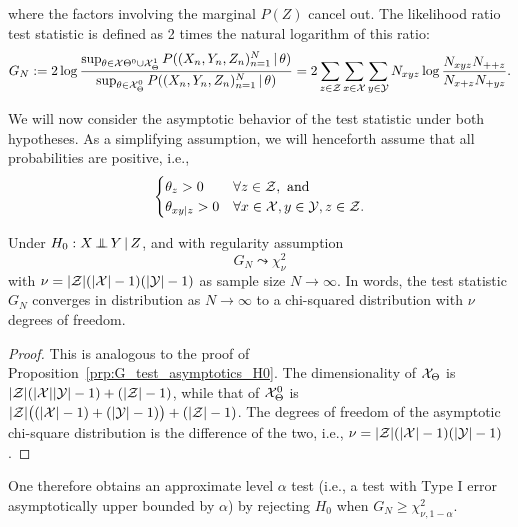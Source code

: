where the factors involving the marginal $P(Z)$ cancel out.
The likelihood ratio test statistic is defined as 2 times the natural logarithm of this ratio:
\begin{equation}\label{eq:cond_G_test_statistic}
G_N := 2 \log \frac{\sup_{\theta\in\mathcal{X}\Theta^0\cup\mathcal{X}_\Theta^1} P((X_n,Y_n,Z_n)_{n=1}^N \operatorname*{|} \theta)}{\sup_{\theta\in\mathcal{X}_\Theta^0} P((X_n,Y_n,Z_n)_{n=1}^N \operatorname*{|} \theta)} = 2 \sum_{z\in\mathcal{Z}} \sum_{x\in\mathcal{X}} \sum_{y\in\mathcal{Y}} N_{xyz} \log \frac{N_{xyz} N_{+ + z}}{N_{x+ z} N_{+ y z}}.
\end{equation}

We will now consider the asymptotic behavior of the test statistic under both hypotheses.
As a simplifying assumption, we will henceforth assume that all probabilities are positive, i.e.,
\begin{equation}\label{eq:cond_G_test_regularity}
  \begin{cases}
    \theta_z > 0 & \forall z \in \mathcal{Z}, \text{ and}\\
    \theta_{xy|z} > 0 & \forall x \in \mathcal{X}, y\in \mathcal{Y}, z\in \mathcal{Z}.
  \end{cases}
\end{equation}
\begin{Prp}\label{prp:cond_G_test_asymptotics_H0}
Under $H_0 : X \operatorname*{\perp\mkern-11mu\perp} Y \operatorname*{|} Z$, and with regularity assumption 
$$G_N \leadsto \chi_\nu^2$$
with $\nu = |\mathcal{Z}|(|\mathcal{X}| - 1)(|\mathcal{Y}| - 1)$ as sample size $N \to \infty$.
In words, the test statistic $G_N$ converges in distribution as $N \to \infty$ to a chi-squared distribution with $\nu$ degrees of freedom.
\end{Prp}
\begin{proof}
This is analogous to the proof of Proposition~\ref{prp:G_test_asymptotics_H0}.
The dimensionality of $\mathcal{X}_\Theta$ is $|\mathcal{Z}|(|\mathcal{X}||\mathcal{Y}| - 1) + (|\mathcal{Z}|-1)$, while
that of $\mathcal{X}_\Theta^0$ is $|\mathcal{Z}|\big((|\mathcal{X}|-1) + (|\mathcal{Y}|-1)\big) + (|\mathcal{Z}|-1)$. The degrees
of freedom of the asymptotic chi-square distribution is the difference of the two, i.e.,
$\nu = |\mathcal{Z}|(|\mathcal{X}| - 1)(|\mathcal{Y}| - 1)$.
\end{proof}

One therefore obtains an approximate level $\alpha$ test (i.e., a test with Type I error asymptotically upper bounded by $\alpha$) 
by rejecting $H_0$ when $G_N \ge \chi_{\nu,1-\alpha}^2$.


